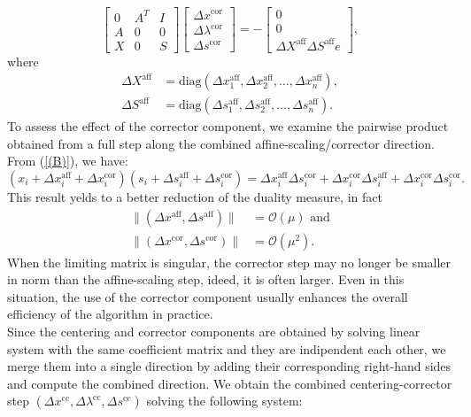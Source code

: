 \documentclass[a4paper,10 pt,titlepage,twoside]{book}
\theoremstyle{plain}
\theoremstyle{definition}
\theoremstyle{remark}
\begin{document}
\begin{equation}\label{(B)}
\begin{bmatrix}
0&A^{T}&I \\A&0&0\\X&0&S
\end{bmatrix}\begin{bmatrix}
\Delta x^{\text{cor}}\\\Delta\lambda^{\text{cor}} \\\Delta s^{\text{cor}}
\end{bmatrix}=-\begin{bmatrix}
0\\0\\\Delta X^{\text{aff}}\Delta S^{\text{aff}}e
\end{bmatrix},
\end{equation}
where
\begin{align*}
\Delta X^{\text{aff}}& = \text{diag}(\Delta x_{1}^{\text{aff}}, \Delta x_{2}^{\text{aff}},\dots,\Delta x_{n}^{\text{aff}}),\\
\Delta S^{\text{aff}}& = \text{diag}(\Delta s_{1}^{\text{aff}}, \Delta s_{2}^{\text{aff}},\dots,\Delta s_{n}^{\text{aff}}).
\end{align*}
To assess the effect of the corrector component, we examine the pairwise product obtained from a full step along the combined affine-scaling/corrector direction. From (\ref{(B)}), we have:
\begin{equation*}
(x_{i}+\Delta x_{i}^{\text{aff}}+\Delta x_{i}^{\text{cor}})(s_{i}+\Delta s_{i}^{\text{aff}}+\Delta s_{i}^{\text{cor}})= \Delta x_{i}^{\text{aff}}\Delta s_{i}^{\text{cor}}+\Delta x_{i}^{\text{cor}}\Delta s_{i}^{\text{aff}}+\Delta x_{i}^{\text{cor}}\Delta s_{i}^{\text{cor}}.
\end{equation*}
This result yelds to a better reduction of the duality measure, in fact
\begin{align*} 
\lVert(\Delta x^{\text{aff}},\Delta s^{\text{aff}}) \rVert &= \mathcal{O}(\mu)\text{ and}\\\lVert(\Delta x^{\text{cor}},\Delta s^{\text{cor}}) \rVert &= \mathcal{O}(\mu^{2}).
\end{align*}
When the limiting matrix is singular, the corrector step may no longer be smaller in norm than the affine-scaling step, ideed, it is often larger. Even in this situation, the use of the corrector component usually enhances the overall efficiency of the algorithm in practice.\\
Since the centering and corrector components are obtained by solving linear system with the same coefficient matrix and they are indipendent each other, we merge them into a single direction by adding their corresponding right-hand sides and compute the combined direction. We obtain the combined centering-corrector step $(\Delta x^{\text{cc}}, \Delta \lambda^{\text{cc}}, \Delta s^{\text{cc}})$ solving the following system:
\end{document}
